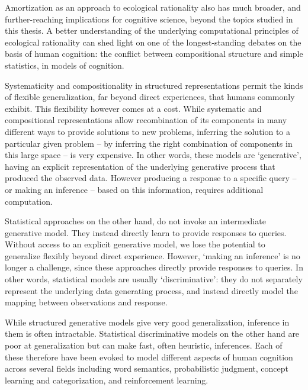 Amortization as an approach to ecological rationality also has much broader, and further-reaching implications for cognitive science, beyond the topics studied in this thesis. A better understanding of the underlying computational principles of ecological rationality can shed light on one of the longest-standing debates on the basis of human cognition: the conflict between compositional structure and simple statistics, in models of cognition.

Systematicity and compositionality\citep{fodor88} in structured representations permit the kinds of flexible generalization, far beyond direct experiences, that humans commonly exhibit. \citep{griffiths2006, shepard1987toward, wu2018generalization, schulz2017compositional}%
This flexibility however comes at a cost. While systematic and compositional representations allow recombination of its components in many different ways to provide solutions to new problems, inferring the solution to a particular given problem – by inferring the right combination of components in this large space – is very expensive. In other words, these models are `generative', having an explicit representation of the underlying generative process that produced the observed data. However producing a response to a specific query -- or making an inference -- based on this information, requires additional computation.

Statistical approaches on the other hand, do not invoke an intermediate generative model. They instead directly learn to provide responses to queries. Without access to an explicit generative model, we lose the potential to generalize flexibly beyond direct experience. However, `making an inference' is no longer a challenge, since these approaches directly provide responses to queries. In other words, statistical models are usually `discriminative': they do not separately represent the underlying data generating process, and instead directly model the mapping between observations and response.

While structured generative models give very good generalization, inference in them is often intractable. Statistical discriminative models on the other hand are poor at generalization but can make fast, often heuristic, inferences. Each of these therefore have been evoked to model different aspects of human cognition across several fields including word semantics\cite{steyvers2007probabilistic, rogers2004semantic, gleitman1990structural}, probabilistic judgment\citep{oaksford2007bayesian, tversky1974judgment}, concept learning and categorization\citep{bruner2017study, medin1978context, shepard1987toward}, and reinforcement learning\citep{gershman2014retrospective, daw2011model, kool2017cost}. 

